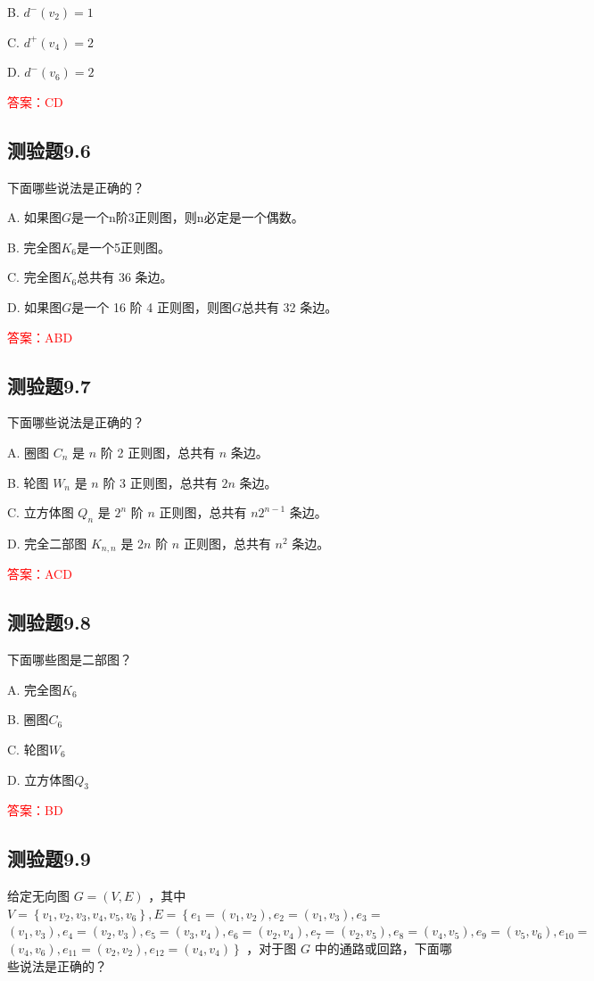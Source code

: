 \documentclass[UTF8, heading=true]{ctexart}
\begin{document}
B. $d^{-}\left(v_2\right)=1$

C. $d^{+}\left(v_4\right)=2$

D. $d^{-}\left(v_6\right)=2$

\textcolor{red}{答案：CD}

\subsection{测验题9.6}

下面哪些说法是正确的？

A. 如果图$G$是一个n阶3正则图，则n必定是一个偶数。

B. 完全图$K_6$是一个5正则图。

C. 完全图$K_6$总共有 36 条边。

D. 如果图$G$是一个 16 阶 4 正则图，则图$G$总共有 32 条边。

\textcolor{red}{答案：ABD}

\subsection{测验题9.7}

下面哪些说法是正确的？

A. 圈图 $C_n$ 是 $n$ 阶 2 正则图，总共有 $n$ 条边。

B. 轮图 $W_n$ 是 $n$ 阶 3 正则图，总共有 $2 n$ 条边。

C. 立方体图 $Q_n$ 是 $2^n$ 阶 $n$ 正则图，总共有 $n 2^{n-1}$ 条边。

D. 完全二部图 $K_{n, n}$ 是 $2 n$ 阶 $n$ 正则图，总共有 $n^2$ 条边。

\textcolor{red}{答案：ACD}

\subsection{测验题9.8}

下面哪些图是二部图？

A. 完全图$K_6$

B. 圈图$C_6$

C. 轮图$W_6$

D. 立方体图$Q_3$

\textcolor{red}{答案：BD}

\subsection{测验题9.9}

给定无向图 $G=(V, E)$ ，其中 $V=\left\{v_1, v_2, v_3, v_4, v_5, v_6\right\}, E=\left\{e_1=\left(v_1, v_2\right), e_2=\left(v_1, v_3\right), e_3=\right.$ $\left(v_1, v_3\right), e_4=\left(v_2, v_3\right), e_5=\left(v_3, v_4\right), e_6=\left(v_2, v_4\right), e_7=\left(v_2, v_5\right), e_8=\left(v_4, v_5\right), e_9=\left(v_5, v_6\right), e_{10}=$ $\left.\left(v_4, v_6\right), e_{11}=\left(v_2, v_2\right), e_{12}=\left(v_4, v_4\right)\right\}$ ，对于图 $G$ 中的通路或回路，下面哪些说法是正确的？
\end{document}
